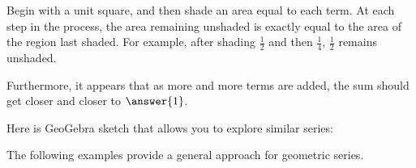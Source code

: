 \documentclass[nooutcomes]{ximera}
\begin{document}
\begin{problem}
\begin{problem}
\begin{problem}
Begin with a unit square, and then shade an area equal to each term.  At each step in the process, the area remaining unshaded is exactly equal to the area of the region last shaded.  For example, after shading $\frac{1}{2}$ and then $\frac{1}{4}$, $\frac{1}{2}$ remains unshaded.  

Furthermore, it appears that as more and more terms are added, the sum should get closer and closer 
to $\answer{1}$.  

Here is GeoGebra sketch that allows you to explore similar series:  
\begin{center}
\end{center}

The following examples provide a general approach for geometric series.  
\end{problem}
\end{problem}
\end{problem}



%
\end{document}
